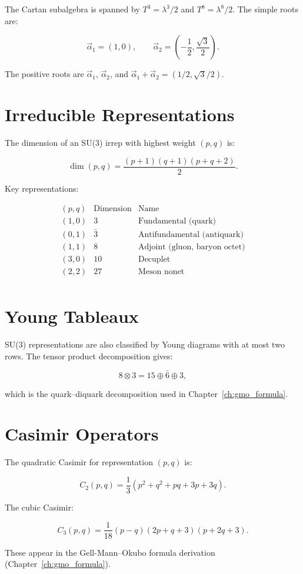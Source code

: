 The Cartan subalgebra is spanned by $T^3 = \lambda^3/2$ and
$T^8 = \lambda^8/2$.  The simple roots are:

\[
\vec{\alpha}_1 = (1, 0),\qquad
\vec{\alpha}_2 = \left(-\frac12, \frac{\sqrt{3}}{2}\right).
\]

The positive roots are $\vec{\alpha}_1$, $\vec{\alpha}_2$, and
$\vec{\alpha}_1 + \vec{\alpha}_2 = (1/2, \sqrt{3}/2)$.

\section{Irreducible Representations}

The dimension of an SU(3) irrep with highest weight $(p,q)$ is:

\[
\dim(p,q) = \frac{(p+1)(q+1)(p+q+2)}{2}.
\]

Key representations:

\[
\begin{array}{ccc}
(p,q) & \text{Dimension} & \text{Name} \\
\hline
(1,0) & 3 & \text{Fundamental (quark)} \\
(0,1) & \bar{3} & \text{Antifundamental (antiquark)} \\
(1,1) & 8 & \text{Adjoint (gluon, baryon octet)} \\
(3,0) & 10 & \text{Decuplet} \\
(2,2) & 27 & \text{Meson nonet} \\
\end{array}
\]

\section{Young Tableaux}

SU(3) representations are also classified by Young diagrams with at most
two rows.  The tensor product decomposition gives:

\[
8 \otimes 3 = 15 \oplus \bar{6} \oplus 3,
\]

which is the quark--diquark decomposition used in
Chapter~\ref{ch:gmo_formula}.

\section{Casimir Operators}

The quadratic Casimir for representation $(p,q)$ is:

\[
C_2(p,q) = \frac{1}{3}(p^2 + q^2 + pq + 3p + 3q).
\]

The cubic Casimir:

\[
C_3(p,q) = \frac{1}{18}(p-q)(2p + q + 3)(p + 2q + 3).
\]

These appear in the Gell-Mann--Okubo formula derivation
(Chapter~\ref{ch:gmo_formula}).
